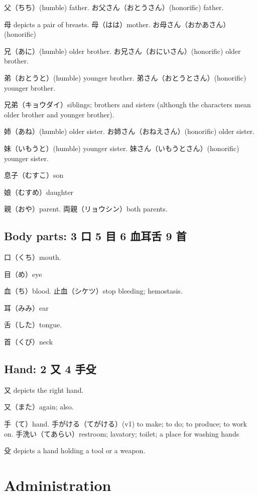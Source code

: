父（ちち）(humble) father.
お父さん（おとうさん）(honorific) father.

母 depicts a pair of breasts.
母（はは）mother.
お母さん（おかあさん）(honorific)

兄（あに）(humble) older brother.
お兄さん（おにいさん）(honorific) older brother.

弟（おとうと）(humble) younger brother.
弟さん（おとうとさん）(honorific) younger brother.

兄弟（キョウダイ）siblings;
brothers and sisters
(although the characters mean older brother and younger brother).

姉（あね）(humble) older sister.
お姉さん（おねえさん）(honorific) older sister.

妹（いもうと）(humble) younger sister.
妹さん（いもうとさん）(honorific) younger sister.

息子（むすこ）son

娘（むすめ）daughter

親（おや）parent.
両親（リョウシン）both parents.

\subsection{Body parts: 3 口 5 目 6 血耳舌 9 首}

口（くち）mouth.

目（め）eye

血（ち）blood.
止血（シケツ）stop bleeding; hemostasis.

耳（みみ）ear

舌（した）tongue.

首（くび）neck

\subsection{Hand: 2 又 4 手殳}

又 depicts the right hand.

又（また）again; also.

手（て）hand.
手がける（てがける）(v1) to make; to do; to produce; to work on.
手洗い（てあらい）restroom; lavatory; toilet; a place for washing hands

殳 depicts a hand holding a tool or a weapon.

\section{Administration}

